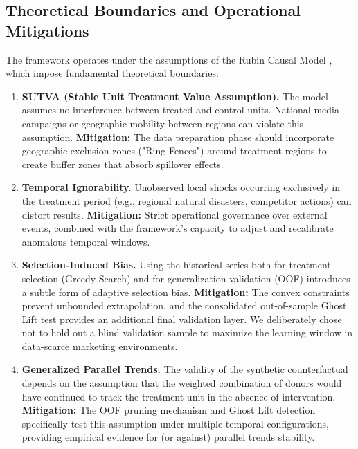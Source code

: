 \documentclass[11pt]{article}
\begin{document}
\subsection{Theoretical Boundaries and Operational Mitigations}
The framework operates under the assumptions of the Rubin Causal Model \cite{ref13,ref9}, which impose fundamental theoretical boundaries:

\begin{enumerate}
\item \textbf{SUTVA (Stable Unit Treatment Value Assumption).} The model assumes no interference between treated and control units. National media campaigns or geographic mobility between regions can violate this assumption. \textbf{Mitigation:} The data preparation phase should incorporate geographic exclusion zones ("Ring Fences") around treatment regions to create buffer zones that absorb spillover effects.
\item \textbf{Temporal Ignorability.} Unobserved local shocks occurring exclusively in the treatment period (e.g., regional natural disasters, competitor actions) can distort results. \textbf{Mitigation:} Strict operational governance over external events, combined with the framework's capacity to adjust and recalibrate anomalous temporal windows.
\item \textbf{Selection-Induced Bias.} Using the historical series both for treatment selection (Greedy Search) and for generalization validation (OOF) introduces a subtle form of adaptive selection bias. \textbf{Mitigation:} The convex constraints prevent unbounded extrapolation, and the consolidated out-of-sample Ghost Lift test provides an additional final validation layer. We deliberately chose not to hold out a blind validation sample to maximize the learning window in data-scarce marketing environments.
\item \textbf{Generalized Parallel Trends.} The validity of the synthetic counterfactual depends on the assumption that the weighted combination of donors would have continued to track the treatment unit in the absence of intervention. \textbf{Mitigation:} The OOF pruning mechanism and Ghost Lift detection specifically test this assumption under multiple temporal configurations, providing empirical evidence for (or against) parallel trends stability.
\end{enumerate}
\end{document}
